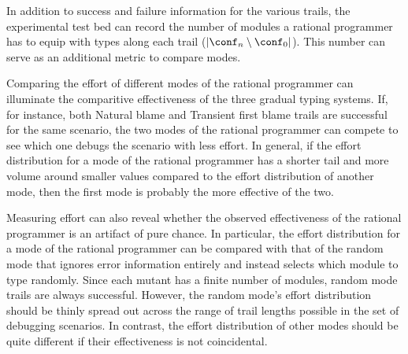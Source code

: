 
In addition to success and failure information for the various trails, the
experimental test bed can record the number of modules a rational programmer has
to equip with types along each trail ($\lvert \conf_n \setminus \conf_0
\rvert$). This number can serve as an additional metric to compare modes.

Comparing the effort of different modes of the rational programmer can
illuminate the comparitive effectiveness of the three gradual typing
systems. If, for instance, both
Natural blame and Transient first blame trails are successful for the same scenario, the two modes of
the rational programmer can compete to see which one debugs the
scenario with less effort. In general, if the effort distribution for a mode of
the rational programmer has a shorter tail and more volume around smaller values
compared to the effort distribution of another mode, then the first mode is
probably the more effective of the two.

Measuring effort can also reveal whether the observed effectiveness of the
rational programmer is an artifact of pure chance.
In particular, the effort distribution for a mode of the rational programmer can be compared with that of
the random mode that ignores error information entirely and instead selects which
module to type randomly.  Since each mutant has a finite number of
modules, random mode trails are always successful. However, the random mode's effort
distribution should be thinly spread out across the range of trail lengths possible
in the set of debugging scenarios.
In contrast, the effort distribution of other modes should be quite different if their effectiveness is not coincidental.

